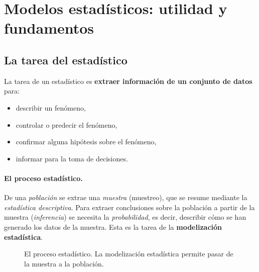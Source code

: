 \section{Modelos estadísticos: utilidad y fundamentos}
\label{sec:t1-modelos}

\subsection{La tarea del estadístico}

La tarea de un estadístico es \textbf{extraer información de un conjunto de datos} para:
\begin{itemize}
  \item describir un fenómeno,
  \item controlar o predecir el fenómeno,
  \item confirmar alguna hipótesis sobre el fenómeno,
  \item informar para la toma de decisiones.
\end{itemize}

\paragraph{El proceso estadístico.} De una \emph{población} se extrae una \emph{muestra}
(muestreo), que se resume mediante la \emph{estadística descriptiva}. Para extraer
conclusiones sobre la población a partir de la muestra (\emph{inferencia}) se necesita la
\emph{probabilidad}, es decir, describir cómo se han generado los datos de la muestra. Esta es
la tarea de la \textbf{modelización estadística}.

\begin{figure}[H]
  \centering
  \caption{El proceso estadístico. La modelización estadística permite pasar de la muestra
    a la población.}
\end{figure}

